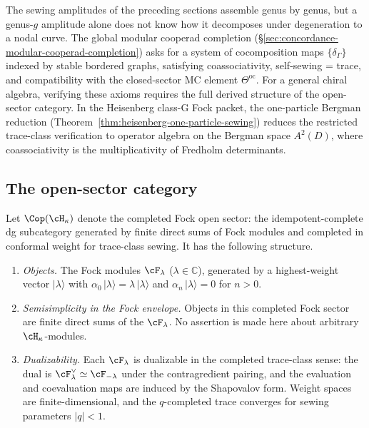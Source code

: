 The sewing amplitudes of the preceding sections assemble genus by
genus, but a genus-$g$ amplitude alone does not know how it decomposes
under degeneration to a nodal curve. The global modular cooperad
completion
(\S\ref{sec:concordance-modular-cooperad-completion}) asks for a
system of cocomposition maps $\{\delta_\Gamma\}$ indexed by stable
bordered graphs, satisfying coassociativity, self-sewing = trace, and
compatibility with the closed-sector MC element
$\Theta^{\mathrm{oc}}$. For a general chiral algebra, verifying these
axioms requires the full derived structure of the open-sector
category. In the Heisenberg class-G Fock packet, the one-particle
Bergman reduction
(Theorem~\ref{thm:heisenberg-one-particle-sewing}) reduces the
restricted trace-class verification to operator algebra on the
Bergman space $A^2(D)$, where coassociativity is the multiplicativity
of Fredholm determinants.

\subsection{The open-sector category}
\label{subsec:heisenberg-open-sector-category}

\begin{proposition}
\label{prop:heisenberg-open-sector}
Let $\Cop(\cH_\kappa)$ denote the completed Fock open sector: the
idempotent-complete dg subcategory generated by finite direct sums of
Fock modules and completed in conformal weight for trace-class
sewing. It has the following structure.
\begin{enumerate}[label=\textup{(\roman*)}]
\item \emph{Objects.} The Fock modules
 $\cF_\lambda$ ($\lambda \in \mathbb{C}$), generated by a
 highest-weight vector $|\lambda\rangle$ with
 $\alpha_0\,|\lambda\rangle = \lambda\,|\lambda\rangle$
 and $\alpha_n\,|\lambda\rangle = 0$ for $n > 0$.
\item \emph{Semisimplicity in the Fock envelope.} Objects in this
 completed Fock sector are finite direct sums of the $\cF_\lambda$.
 No assertion is made here about arbitrary $\cH_\kappa$-modules.
\item \emph{Dualizability.} Each $\cF_\lambda$ is dualizable
 in the completed trace-class sense: the dual is
 $\cF_\lambda^\vee \simeq \cF_{-\lambda}$ under the contragredient
 pairing, and the evaluation and coevaluation maps are induced by the
 Shapovalov form. Weight spaces are finite-dimensional, and the
 $q$-completed trace converges for sewing parameters $|q|<1$.
\end{enumerate}
\end{proposition}

